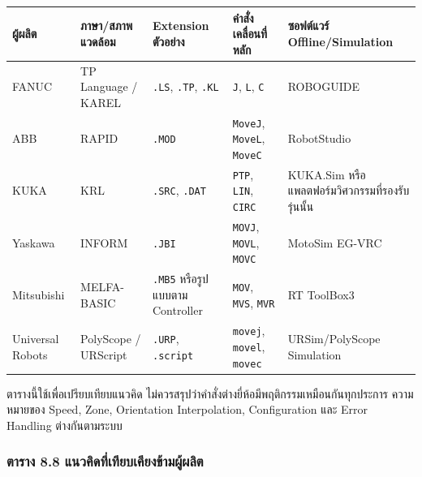 \begin{table}[htbp]
    \centering
    \small
    \begin{tabularx}{\textwidth}{@{}L{0.13\textwidth}L{0.22\textwidth}L{0.17\textwidth}L{0.18\textwidth}Y@{}}
        \hline
        \textbf{ผู้ผลิต} & \textbf{ภาษา/สภาพแวดล้อม} & \textbf{Extension ตัวอย่าง} & \textbf{คำสั่งเคลื่อนที่หลัก} & \textbf{ซอฟต์แวร์ Offline/Simulation} \\
        \hline
        FANUC & TP Language / KAREL & \texttt{.LS}, \texttt{.TP}, \texttt{.KL} & \texttt{J}, \texttt{L}, \texttt{C} & ROBOGUIDE \\
        ABB & RAPID & \texttt{.MOD} & \texttt{MoveJ}, \texttt{MoveL}, \texttt{MoveC} & RobotStudio \\
        KUKA & KRL & \texttt{.SRC}, \texttt{.DAT} & \texttt{PTP}, \texttt{LIN}, \texttt{CIRC} & KUKA.Sim หรือแพลตฟอร์มวิศวกรรมที่รองรับรุ่นนั้น \\
        Yaskawa & INFORM & \texttt{.JBI} & \texttt{MOVJ}, \texttt{MOVL}, \texttt{MOVC} & MotoSim EG-VRC \\
        Mitsubishi & MELFA-BASIC & \texttt{.MB5} หรือรูปแบบตาม Controller & \texttt{MOV}, \texttt{MVS}, \texttt{MVR} & RT ToolBox3 \\
        Universal Robots & PolyScope / URScript & \texttt{.URP}, \texttt{.script} & \texttt{movej}, \texttt{movel}, \texttt{movec} & URSim/PolyScope Simulation \\
        \hline
    \end{tabularx}
\end{table}

ตารางนี้ใช้เพื่อเปรียบเทียบแนวคิด ไม่ควรสรุปว่าคำสั่งต่างยี่ห้อมีพฤติกรรมเหมือนกันทุกประการ ความหมายของ Speed, Zone, Orientation Interpolation, Configuration และ Error Handling ต่างกันตามระบบ

\subsubsection{ตาราง 8.8 แนวคิดที่เทียบเคียงข้ามผู้ผลิต}

